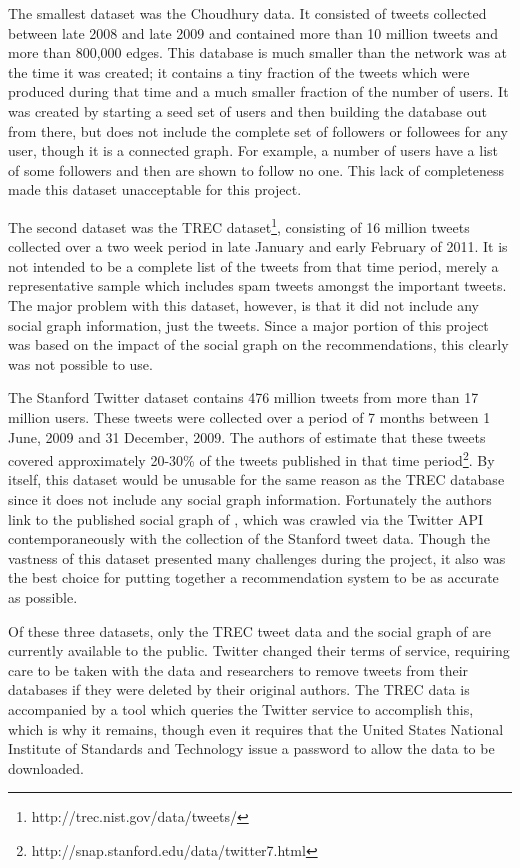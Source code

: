 The smallest dataset was the Choudhury data. It consisted of tweets collected between late 2008 and late 2009 and contained more than 10 million tweets and more than 800,000 edges. This database is much smaller than the network was at the time it was created; it contains a tiny fraction of the tweets which were produced during that time and a much smaller fraction of the number of users. It was created by starting a seed set of users and then building the database out from there, but does not include the complete set of followers or followees for any user, though it is a connected graph. For example, a number of users have a list of some followers and then are shown to follow no one. This lack of completeness made this dataset unacceptable for this project.

The second dataset was the TREC dataset\footnote{http://trec.nist.gov/data/tweets/}, consisting of 16 million tweets collected over a two week period in late January and early February of 2011. It is not intended to be a complete list of the tweets from that time period, merely a representative sample which includes spam tweets amongst the important tweets. The major problem with this dataset, however, is that it did not include any social graph information, just the tweets. Since a major portion of this project was based on the impact of the social graph on the recommendations, this clearly was not possible to use.

The Stanford Twitter dataset contains 476 million tweets from more than 17 million users. These tweets were collected over a period of 7 months between 1 June, 2009 and 31 December, 2009. The authors of \cite{Yang2011} estimate that these tweets covered approximately 20-30\% of the tweets published in that time period\footnote{http://snap.stanford.edu/data/twitter7.html}. By itself, this dataset would be unusable for the same reason as the TREC database since it does not include any social graph information. Fortunately the authors link to the published social graph of \cite{Kwak2010}, which was crawled via the Twitter API contemporaneously with the collection of the Stanford tweet data. Though the vastness of this dataset presented many challenges during the project, it also was the best choice for putting together a recommendation system to be as accurate as possible.

Of these three datasets, only the TREC tweet data and the social graph of \cite{Kwak2010} are currently available to the public. Twitter changed their terms of service, requiring care to be taken with the data and researchers to remove tweets from their databases if they were deleted by their original authors. The TREC data is accompanied by a tool which queries the Twitter service to accomplish this, which is why it remains, though even it requires that the United States National Institute of Standards and Technology issue a password to allow the data to be downloaded.

